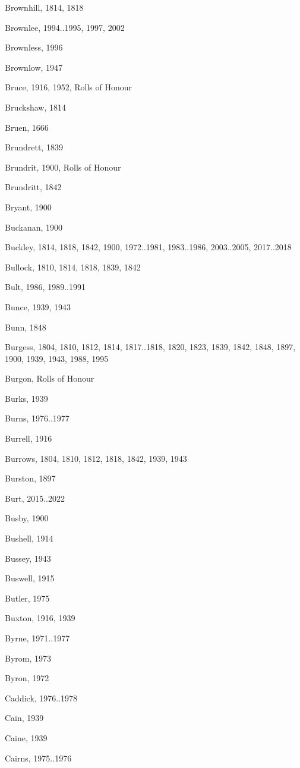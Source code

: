 {\begin{theindex}
\item Brownhill, 1814, 1818
\item Brownlee, 1994..1995, 1997, 2002
\item Brownless, 1996
\item Brownlow, 1947
\item Bruce, 1916, 1952, Rolls of Honour
\item Bruckshaw, 1814
\item Bruen, 1666
\item Brundrett, 1839
\item Brundrit, 1900, Rolls of Honour
\item Brundritt, 1842
\item Bryant, 1900
\item Buckanan, 1900
\item Buckley, 1814, 1818, 1842, 1900, 1972..1981, 1983..1986, 2003..2005, 2017..2018
\item Bullock, 1810, 1814, 1818, 1839, 1842
\item Bult, 1986, 1989..1991
\item Bunce, 1939, 1943
\item Bunn, 1848
\item Burgess, 1804, 1810, 1812, 1814, 1817..1818, 1820, 1823, 1839, 1842, 1848, 1897, 1900, 1939, 1943, 1988, 1995
\item Burgon, Rolls of Honour
\item Burks, 1939
\item Burns, 1976..1977
\item Burrell, 1916
\item Burrows, 1804, 1810, 1812, 1818, 1842, 1939, 1943
\item Burston, 1897
\item Burt, 2015..2022
\item Busby, 1900
\item Bushell, 1914
\item Bussey, 1943
\item Buswell, 1915
\item Butler, 1975
\item Buxton, 1916, 1939
\item Byrne, 1971..1977
\item Byrom, 1973
\item Byron, 1972
\item Caddick, 1976..1978
\item Cain, 1939
\item Caine, 1939
\item Cairns, 1975..1976

\end{theindex}}
